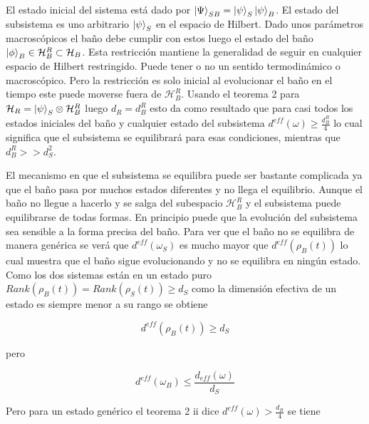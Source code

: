 El estado inicial del sistema está dado por $\ket{\Psi}_{SB}=\ket{\psi}_{S} \ket{\psi}_{B}$. El estado del subsistema es uno arbitrario $\ket{\psi}_{S}$ en el espacio de Hilbert. Dado unos parámetros macroscópicos el baño  debe cumplir con estos luego el estado del baño $\ket{\phi}_{B} \in \mathcal{H}_{B}^{R} \subset\mathcal{H}_{B}$. Esta restricción mantiene la generalidad de seguir en cualquier espacio de Hilbert restringido. Puede tener o no un sentido termodinámico o macroscópico. Pero la restricción es solo inicial al evolucionar el baño en el tiempo este puede moverse fuera de $\mathcal{H}_{B}^{R}$. Usando el teorema 2 para $\mathcal{H}_{R}= \ket{\psi}_{S} \otimes \mathcal{H}_{B}^{R}$ luego $d_{R}=d_{B}^{R}$ esto da como resultado que para casi todos los estados iniciales del baño y cualquier estado del subsistema $d^{eff}(\omega) \geq \frac{d_{B}^{R}}{4}$ lo cual significa que el subsistema se equilibrará para esas condiciones, mientras que $d_{B}^{R} >> d_{S}^{2}$.

El mecanismo en que el subsistema se equilibra puede ser bastante complicada ya que el baño pasa por muchos estados diferentes y no llega el equilibrio. Aunque el baño no llegue a hacerlo y se salga del subespacio $\mathcal{H}_{B}^{R}$ y el subsistema  puede equilibrarse de todas formas. En principio puede que la evolución del subsistema sea sensible a la forma precisa del baño.
Para ver que el baño no se equilibra de manera genérica se verá que $d^{eff}(\omega_{S})$ es mucho mayor que $d^{eff}(\rho_{B}(t))$ lo cual muestra que el baño sigue evolucionando y no se equilibra en ningún estado. Como los dos sistemas están en un estado puro $Rank(\rho_{B}(t))=Rank(\rho_{S}(t)) \geq d_{S}$ como la dimensión efectiva de un estado es siempre menor a su rango se obtiene 

\begin{equation}
d^{eff}(\rho_{B}(t)) \geq d_{S}
\end{equation}

pero 

\begin{equation}
d^{eff}(\omega_{B})\leq \frac{d_{eff}(\omega)}{d_{S}}
\end{equation}

Pero para un estado genérico el teorema 2 ii dice $d^{eff}(\omega) > \frac{d_{R}}{4}$ se tiene

